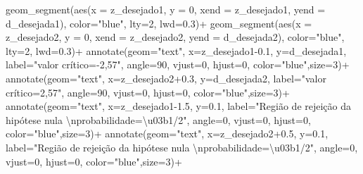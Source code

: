 \documentclass[
]{book}
\newenvironment{Shaded}{\begin{snugshade}}{\end{snugshade}}
\newcommand{\AttributeTok}[1]{\textcolor[rgb]{0.77,0.63,0.00}{#1}}
\newcommand{\DecValTok}[1]{\textcolor[rgb]{0.00,0.00,0.81}{#1}}
\newcommand{\FloatTok}[1]{\textcolor[rgb]{0.00,0.00,0.81}{#1}}
\newcommand{\FunctionTok}[1]{\textcolor[rgb]{0.00,0.00,0.00}{#1}}
\newcommand{\NormalTok}[1]{#1}
\newcommand{\SpecialCharTok}[1]{\textcolor[rgb]{0.00,0.00,0.00}{#1}}
\newcommand{\StringTok}[1]{\textcolor[rgb]{0.31,0.60,0.02}{#1}}
\begin{document}
\begin{Shaded}
\begin{Highlighting}[]
  \FunctionTok{geom\_segment}\NormalTok{(}\FunctionTok{aes}\NormalTok{(}\AttributeTok{x =}\NormalTok{ z\_desejado1, }\AttributeTok{y =} \DecValTok{0}\NormalTok{, }\AttributeTok{xend =}\NormalTok{ z\_desejado1, }\AttributeTok{yend =}\NormalTok{ d\_desejada1), }\AttributeTok{color=}\StringTok{"blue"}\NormalTok{, }\AttributeTok{lty=}\DecValTok{2}\NormalTok{, }\AttributeTok{lwd=}\FloatTok{0.3}\NormalTok{)}\SpecialCharTok{+}
  \FunctionTok{geom\_segment}\NormalTok{(}\FunctionTok{aes}\NormalTok{(}\AttributeTok{x =}\NormalTok{ z\_desejado2, }\AttributeTok{y =} \DecValTok{0}\NormalTok{, }\AttributeTok{xend =}\NormalTok{ z\_desejado2, }\AttributeTok{yend =}\NormalTok{ d\_desejada2), }\AttributeTok{color=}\StringTok{"blue"}\NormalTok{, }\AttributeTok{lty=}\DecValTok{2}\NormalTok{, }\AttributeTok{lwd=}\FloatTok{0.3}\NormalTok{)}\SpecialCharTok{+}
  \FunctionTok{annotate}\NormalTok{(}\AttributeTok{geom=}\StringTok{"text"}\NormalTok{, }\AttributeTok{x=}\NormalTok{z\_desejado1}\FloatTok{{-}0.1}\NormalTok{, }\AttributeTok{y=}\NormalTok{d\_desejada1, }\AttributeTok{label=}\StringTok{"valor crítico={-}2,57"}\NormalTok{, }\AttributeTok{angle=}\DecValTok{90}\NormalTok{, }\AttributeTok{vjust=}\DecValTok{0}\NormalTok{, }\AttributeTok{hjust=}\DecValTok{0}\NormalTok{, }\AttributeTok{color=}\StringTok{"blue"}\NormalTok{,}\AttributeTok{size=}\DecValTok{3}\NormalTok{)}\SpecialCharTok{+}
  \FunctionTok{annotate}\NormalTok{(}\AttributeTok{geom=}\StringTok{"text"}\NormalTok{, }\AttributeTok{x=}\NormalTok{z\_desejado2}\FloatTok{+0.3}\NormalTok{, }\AttributeTok{y=}\NormalTok{d\_desejada2, }\AttributeTok{label=}\StringTok{"valor crítico=2,57"}\NormalTok{, }\AttributeTok{angle=}\DecValTok{90}\NormalTok{, }\AttributeTok{vjust=}\DecValTok{0}\NormalTok{, }\AttributeTok{hjust=}\DecValTok{0}\NormalTok{, }\AttributeTok{color=}\StringTok{"blue"}\NormalTok{,}\AttributeTok{size=}\DecValTok{3}\NormalTok{)}\SpecialCharTok{+}
  \FunctionTok{annotate}\NormalTok{(}\AttributeTok{geom=}\StringTok{"text"}\NormalTok{, }\AttributeTok{x=}\NormalTok{z\_desejado1}\FloatTok{{-}1.5}\NormalTok{, }\AttributeTok{y=}\FloatTok{0.1}\NormalTok{, }\AttributeTok{label=}\StringTok{"Região de rejeição da hipótese nula }\SpecialCharTok{\textbackslash{}n}\StringTok{probabilidade=\textbackslash{}u03b1/2"}\NormalTok{, }\AttributeTok{angle=}\DecValTok{0}\NormalTok{, }\AttributeTok{vjust=}\DecValTok{0}\NormalTok{, }\AttributeTok{hjust=}\DecValTok{0}\NormalTok{, }\AttributeTok{color=}\StringTok{"blue"}\NormalTok{,}\AttributeTok{size=}\DecValTok{3}\NormalTok{)}\SpecialCharTok{+}
  \FunctionTok{annotate}\NormalTok{(}\AttributeTok{geom=}\StringTok{"text"}\NormalTok{, }\AttributeTok{x=}\NormalTok{z\_desejado2}\FloatTok{+0.5}\NormalTok{, }\AttributeTok{y=}\FloatTok{0.1}\NormalTok{, }\AttributeTok{label=}\StringTok{"Região de rejeição da hipótese nula }\SpecialCharTok{\textbackslash{}n}\StringTok{probabilidade=\textbackslash{}u03b1/2"}\NormalTok{, }\AttributeTok{angle=}\DecValTok{0}\NormalTok{, }\AttributeTok{vjust=}\DecValTok{0}\NormalTok{, }\AttributeTok{hjust=}\DecValTok{0}\NormalTok{, }\AttributeTok{color=}\StringTok{"blue"}\NormalTok{,}\AttributeTok{size=}\DecValTok{3}\NormalTok{)}\SpecialCharTok{+}

\end{Highlighting}
\end{Shaded}
\end{document}
